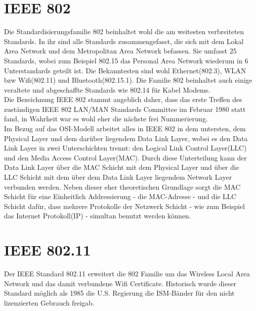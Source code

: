 \documentclass[a4paper,13pt]{scrartcl}
\begin{document}
\section{IEEE 802}
Die Standardisierungsfamilie 802 beinhaltet wohl die am weitesten verbreiteten Standards. In ihr sind alle Standards zusammengefasst, die sich mit dem Lokal Area Network und dem Metropolitan Area Network befassen. Sie umfasst 25 Standards, wobei zum Beispiel 802.15 das Personal Area Network wiederum in 6 Unterstandards geteilt ist. Die Bekanntesten sind wohl Ethernet(802.3), WLAN bzw Wifi(802.11) und Bluetooth(802.15.1). Die Familie 802 beinhaltet auch einige veraltete und abgeschaffte Standards wie 802.14 für Kabel Modems. \\
Die Bezeichnung IEEE 802 stammt angeblich daher, dass das erste Treffen des zuständigen \glqq IEEE 802 LAN/MAN Standards Committee \grqq  im Februar 1980 statt fand, in Wahrheit war es wohl eher die nächste frei Nummerierung.\\
Im Bezug auf das OSI-Modell arbeitet alles in IEEE 802 in dem untersten, dem Physical Layer und dem darüber liegendem Data Link Layer, wobei es den Data Link Layer in zwei Unterschichten trennt: den Logical Link Control Layer(LLC) und den Media Access Control Layer(MAC). Durch diese Unterteilung kann der Data Link Layer über die MAC Schicht mit dem Physical Layer und über die LLC Schicht mit dem über dem Data Link Layer liegendem Network Layer verbunden werden. Neben dieser eher theoretischen Grundlage sorgt die MAC Schicht für eine Einheitlich Addressierung - die MAC-Adresse - und die LLC Schicht dafür, dass mehrere Protokolle der Netzwerk Schicht - wie zum Beispiel das Internet Protokoll(IP) - simultan benutzt werden können. \newpage
\section{IEEE 802.11}
Der IEEE Standard 802.11 erweitert die 802 Familie um das Wireless Local Area Network und das damit verbundene Wifi Certificate. Historisch wurde dieser Standard möglich als 1985 die U.S. Regierung die ISM-Bänder für den nicht lizenzierten Gebrauch freigab.\\
\end{document}
